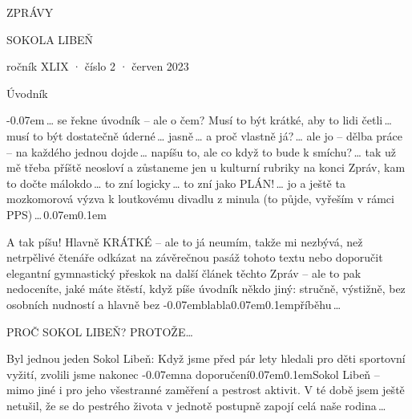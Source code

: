 \documentclass[11pt]{article}
\newcommand{\titlesize}{\fontsize{56pt}{67pt}}
\newcommand{\luv}{\clqq\kern-0.07em}
\newcommand{\ruv}{\kern0.07em\crqq\kern0.1em}
\begin{document}
\pagecolor{sokolred}
\color{white}
\begin{center}
\vspace*{\fill}

{\titlesize \fugner ZPRÁVY}

{\titlesize \tyrs SOKOLA LIBEŇ}

\vspace*{1cm}

{\large ročník XLIX · číslo 2 · červen 2023}

\vspace*{\fill}
\end{center}

\clearpage
\normalcolor
\nopagecolor
{}

\pagestyle{uvodnik}


{\fontsize{48pt}{57pt} \fugner \color{sokolred} \noindent Úvodník}

\vspace*{12pt}

\noindent
\luv\,\ldots{} se řekne úvodník – ale o čem? Musí to být krátké, aby to lidi četli\,\ldots{} musí to být dostatečně úderné\,\ldots{} jasně\,\ldots{} a proč vlastně já?\,\ldots{} ale jo – dělba práce – na každého jednou dojde\,\ldots{} napíšu to, ale co když to bude k smíchu?\,\ldots{} tak už mě třeba příště neosloví a zůstaneme jen u kulturní rubriky na konci Zpráv, kam to dočte málokdo\,\ldots{} to zní logicky\,\ldots{} to zní jako PLÁN!\,\ldots{} jo a ještě ta mozkomorová výzva k loutkovému divadlu z minula (to půjde, vyřeším v rámci PPS)\,\ldots{}\,\ruv

A tak píšu! Hlavně KRÁTKÉ – ale to já neumím, takže mi nezbývá, než netrpělivé čtenáře odkázat na závěrečnou pasáž tohoto textu nebo doporučit elegantní gymnastický přeskok na další článek těchto Zpráv -- ale to pak nedoceníte, jaké máte štěstí, když píše úvodník někdo jiný: stručně, výstižně, bez osobních nudností a hlavně bez \luv blabla\ruv  příběhu\,\ldots{}

\vspace*{12pt}

{\noindent \huge \tyrs PROČ SOKOL LIBEŇ? PROTOŽE\ldots{}}

\vspace*{12pt}
\noindent Byl jednou jeden Sokol Libeň: Když jsme před pár lety hledali pro děti sportovní vyžití, zvolili jsme nakonec \luv na doporučení\ruv Sokol Libeň – mimo jiné i pro jeho všestranné zaměření a pestrost aktivit. V té době jsem ještě netušil, že se do pestrého života v jednotě postupně zapojí celá naše rodina\,\ldots{}
\end{document}
